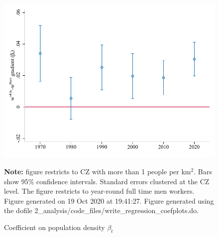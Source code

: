 \begin{figure}[!h]
\centering
\caption{Coefficient on population density $ \beta_t $}
\includegraphics[width=.6\textwidth]{../2_analysis/output/figures/baseline_race_gradients_l_czone_density_full_time}
\par \begin{minipage}[h]{\textwidth}{\tiny\textbf{Note:} figure restricts to CZ with more than 1 people per km$^2$. Bars show 95\% confidence intervals. Standard errors clustered at the CZ level. The figure restricts to year-round full time men workers. Figure generated on 19 Oct 2020 at 19:41:27. Figure generated using the dofile 2\_analysis/code\_files/write\_regression\_coefplots.do.}\end{minipage}
\end{figure}
